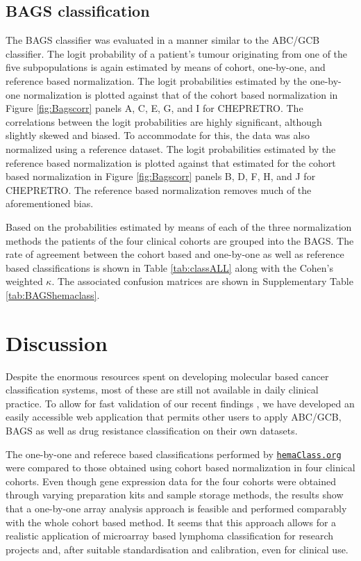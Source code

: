 \documentclass[10pt,letterpaper]{article}
\newcommand{\hemaClass}{\href{http://hemaClass.org}{\texttt{hemaClass.org}}}
\begin{document}
\subsection*{BAGS classification}
The BAGS classifier was evaluated in a manner similar to the ABC/GCB classifier.
The logit probability of a patient's tumour originating from one of the five subpopulations is again estimated by means of cohort, one-by-one, and reference based normalization.
The logit probabilities estimated by the one-by-one normalization is plotted against that of the cohort based normalization in Figure \ref{fig:Bagscorr} panels A, C, E, G, and I for CHEPRETRO.
The correlations between the logit probabilities are highly significant, although slightly skewed and biased.
To accommodate for this, the data was also normalized using a reference dataset.
The logit probabilities estimated by the reference based normalization is plotted against that estimated for the cohort based normalization in Figure \ref{fig:Bagscorr} panels B, D, F, H, and J for CHEPRETRO.
The reference based normalization removes much of the aforementioned bias.

Based on the probabilities estimated by means of each of the three normalization methods the patients of the four clinical cohorts are grouped into the BAGS.
The rate of agreement between the cohort based and one-by-one as well as reference based classifications is shown in Table \ref{tab:classALL} along with the Cohen's weighted $\kappa$.
The associated confusion matrices are shown in Supplementary Table \ref{tab:BAGShemaclass}.




\section*{Discussion}
Despite the enormous resources spent on developing molecular based cancer classification systems,
most of these are still not available in daily clinical practice.
To allow for fast validation of our recent findings \cite{DybkaerBoegsted2015, Falgreen2015}, we have developed an easily accessible web application that permits other users to apply ABC/GCB, BAGS as well as drug resistance classification on their own datasets.

The one-by-one and referece based classifications performed by \hemaClass{} were compared to those obtained using cohort based normalization in four clinical cohorts.
Even though gene expression data for the four cohorts were obtained through varying preparation kits and sample storage methods, the results show that a one-by-one array analysis approach is feasible and performed comparably with the whole cohort based method.
It seems that this approach allows for a realistic application of microarray based lymphoma classification for research projects and, after suitable standardisation and calibration, even for clinical use.
\end{document}
